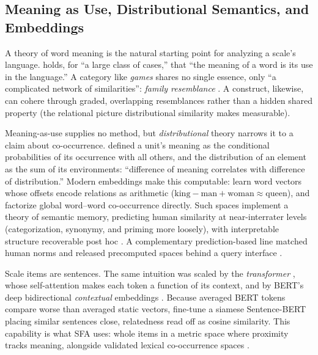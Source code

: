 \subsection{Meaning as Use, Distributional Semantics, and Embeddings}

A theory of word meaning is the natural starting point for analyzing a scale's
language. \citet[\S43]{wittgenstein-1953} holds, for ``a large class of cases,''
that ``the meaning of a word is its use in the language.'' A category like
\emph{games} shares no single essence, only ``a complicated network of
similarities'': \emph{family resemblance} \citep[\S\S66--67]{wittgenstein-1953}. A
construct, likewise, can cohere through graded, overlapping resemblances rather than
a hidden shared property (the relational picture distributional similarity makes
measurable).

Meaning-as-use supplies no method, but \emph{distributional} theory narrows it to a
claim about co-occurrence. \citet{joos-1950} defined a unit's meaning as the
conditional probabilities of its occurrence with all others, and
\citet{harris-1954} the distribution of an element as the sum of its environments:
``difference of meaning correlates with difference of distribution.'' Modern
embeddings make this computable: \citet{mikolov-etal-2013} learn word vectors whose
offsets encode relations as arithmetic
($\mathrm{king}-\mathrm{man}+\mathrm{woman}\approx\mathrm{queen}$), and
\citet{pennington-etal-2014} factorize global word--word co-occurrence directly.
Such spaces implement a theory of semantic memory, predicting human similarity at
near-interrater levels (categorization, synonymy, and priming more loosely), with
interpretable structure recoverable post hoc \citep{gunther-etal-2019}. A complementary
prediction-based line matched human norms and released precomputed spaces behind a
query interface \citep{mandera-etal-2017}.

Scale items are sentences. The same intuition was scaled by the \emph{transformer}
\citep{vaswani-etal-2017}, whose self-attention makes each token a function of its
context, and by BERT's deep bidirectional \emph{contextual} embeddings
\citep{devlin-etal-2019}. Because averaged BERT tokens compare worse than averaged
static vectors, \citet{reimers-gurevych-2019} fine-tune a siamese Sentence-BERT
placing similar sentences close, relatedness read off as cosine similarity. This
capability is what SFA uses: whole items in a metric space where proximity tracks
meaning, alongside validated lexical co-occurrence spaces \citep{westbury-preprint}.
